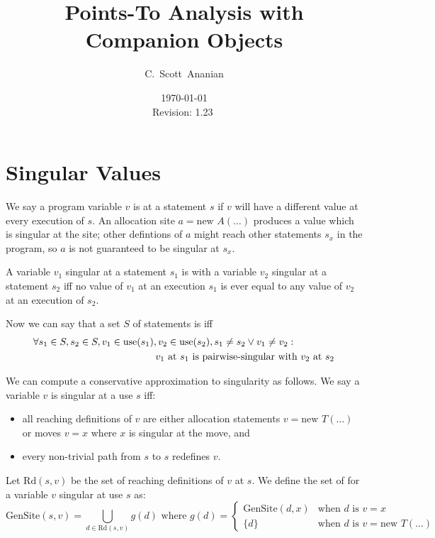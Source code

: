 \documentclass[11pt,notitlepage]{article}
\author{C.~Scott~Ananian}
\title{Points-To Analysis with Companion Objects}
\date{\today \\ $ $Revision: 1.23 $ $}
\begin{document}

\maketitle
\section{Singular Values}

We say a program variable $v$ is  at a statement $s$
if $v$ will have a different value at every execution of $s$.  An
allocation site $a = \text{new }A(\ldots)$ produces a value which is singular
at the site; other defintions of $a$ might reach other statements
$s_x$ in the program, so $a$ is not guaranteed to be singular at $s_x$.

A variable $v_1$ singular at a statement $s_1$ is
 with a variable $v_2$ singular at a statement
$s_2$ iff no value of $v_1$ at an execution $s_1$ is ever equal to any
value of $v_2$ at an execution of $s_2$.

Now we can say that a set $S$ of statements is
 iff
\begin{eqnarray*}\lefteqn{
\forall s_1 \in S, s_2 \in S, v_1 \in \text{use}(s_1), v_2 \in \text{use}(s_2),
  s_1 \neq s_2 \vee v_1 \neq v_2:
} \hspace{4cm}\\ & &
v_1 \text{ at } s_1 \text{ is pairwise-singular with } v_2 \text{ at } s_2
\end{eqnarray*}

We can compute a conservative approximation to singularity as follows.
We say a variable $v$ is singular at a use $s$ iff:
\begin{itemize}
\item all reaching definitions of $v$ are either allocation statements 
$v = \text{new }T(\ldots)$ or moves $v = x$ where $x$ is singular at
the move, and
\item every non-trivial path from $s$ to $s$ redefines $v$.
\end{itemize}

Let $\text{Rd}(s,v)$ be the set of reaching definitions of $v$ at $s$.
We define the set of  for a variable $v$ singular at
use $s$ as:
\begin{displaymath}
\text{GenSite}(s,v) %
 =
\bigcup_{d \in \text{Rd}(s,v)} g(d)
\text{ where }
g(d) = \left\{ \begin{array}{cl}
                \text{GenSite}(d,x) &\text{when } d \text{ is } v=x \\
                \{d\}&\text{when } d \text{ is } v=\text{new } T(\ldots)
                \end{array}\right.
\end{displaymath}
\end{document}
